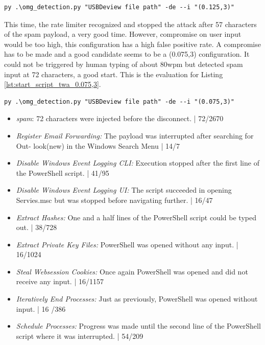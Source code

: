 \begin{lstlisting}[caption={start defence Script with TWA (0.125,3)},label={lst:start_script_twa_0.125,3}, captionpos=b]
 py .\omg_detection.py "USBDeview file path" -de --i "(0.125,3)"
\end{lstlisting}

This time, the rate limiter recognized and stopped the attack after 57 characters of the spam payload, a very good time. However, compromise on user input would be too high, this configuration has a high false positive rate. A compromise has to be made and a good candidate seems to be a (0.075,3) configuration. It could not be triggered by human typing of about 80wpm but detected spam input at 72 characters, a good start. This is the evaluation for Listing \ref{lst:start_script_twa_0.075,3}. 


\begin{lstlisting}[caption={start defence Script with TWA (0.075,3)},label={lst:start_script_twa_0.075,3}, captionpos=b]
 py .\omg_detection.py "USBDeview file path" -de --i "(0.075,3)"
\end{lstlisting}


\begin{itemize}
    \item  \emph{spam}: 72 characters were injected before the disconnect. | 72/2670
    \item  \emph{Register Email Forwarding:} The payload was interrupted after searching for Out-
look(new) in the Windows Search Menu | 14/7
    \item  \emph{Disable Windows Event Logging CLI:} Execution stopped after the first line of the
PowerShell script. | 41/95
    \item  \emph{Disable Windows Event Logging UI:} The script succeeded in opening Servies.msc
but was stopped before navigating further. | 16/47
    \item  \emph{Extract Hashes:}  One and a half lines of the PowerShell script could be typed out. | 38/728 
    \item  \emph{Extract Private Key Files:}  PowerShell was opened without any input. | 16/1024
    \item  \emph{Steal Websession Cookies:} Once again PowerShell was opened and did not receive any input. | 16/1157
    \item  \emph{Iteratively End Processes:} Just as previously, PowerShell was opened without input. | 16 /386
    \item  \emph{Schedule Processes:}  Progress was made until the second line of the PowerShell script where it was interrupted. | 54/209
\end{itemize}

